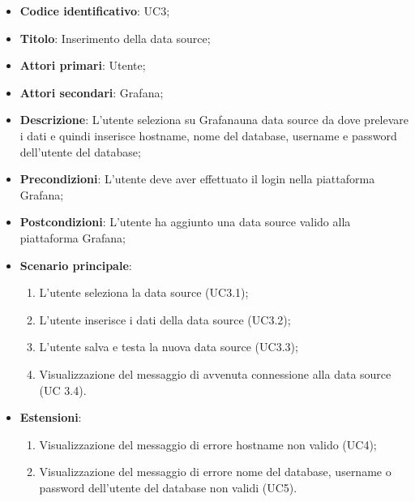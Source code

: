 \begin{itemize}
    \item \textbf{Codice identificativo}: UC3;
    \item \textbf{Titolo}: Inserimento della data source;
    \item \textbf{Attori primari}: Utente;
    \item \textbf{Attori secondari}: Grafana\glo;
    \item \textbf{Descrizione}: L'utente seleziona su Grafana\glosp una data source da dove prelevare i dati e quindi inserisce hostname, nome del database, username e                                password dell'utente del database;
    \item \textbf{Precondizioni}: L'utente deve aver effettuato il login nella piattaforma Grafana\glo;
    \item \textbf{Postcondizioni}: L'utente ha aggiunto una data source valido alla piattaforma Grafana\glo;
    \item \textbf{Scenario principale}:
    \begin{enumerate}
        \item L'utente seleziona la data source (UC3.1);
        \item L'utente inserisce i dati della data source (UC3.2);
        \item L'utente salva e testa la nuova data source (UC3.3);
        \item Visualizzazione del messaggio di avvenuta connessione alla data source (UC 3.4).
    \end{enumerate}
    \item \textbf{Estensioni}:
    \begin{enumerate}
        \item Visualizzazione del messaggio di errore hostname non valido (UC4);
        \item Visualizzazione del messaggio di errore nome del database, username o password dell'utente del database non validi (UC5).
    \end{enumerate}
\end{itemize}
